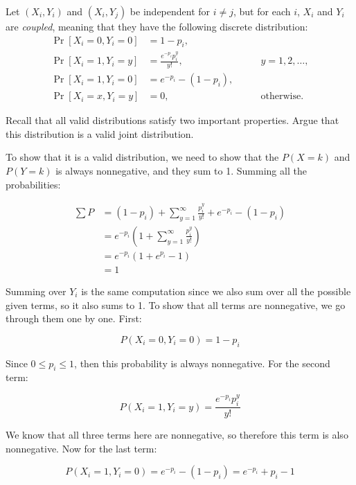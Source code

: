 \documentclass[11pt]{article}
\begin{document}
\begin{Parts}
    \setcounter{enumi}{2}
    \Part Let $(X_i, Y_i)$ and $(X_i, Y_j)$ be independent for $i \ne j$, but for each $i$, $X_i$ and $Y_i$ are \textit{coupled}, meaning that they have the following discrete distribution:
    \begin{align*}
        \Pr[X_i=0, Y_i=0] &= 1-p_i, & \\
        \Pr[X_i=1, Y_i=y] &= \frac{e^{-p_i} p_i^y}{y!}, &\qquad y = 1, 2, \dotsc, \\
        \Pr[X_i=1, Y_i=0] &= e^{-p_i} - (1-p_i), & \\
        \Pr[X_i=x, Y_i=y] &= 0, & \qquad \text{otherwise}.
    \end{align*}

    Recall that all valid distributions satisfy two important properties.
    Argue that this distribution is a valid joint distribution.

    \begin{solution}
        To show that it is a valid distribution, we need to show that the $P(X = k)$ and $P(Y = k)$ is always nonnegative, and they sum to 1. Summing all the probabilities: 

        \begin{align*}
            \sum P &= (1 - p_i) + \sum_{y = 1}^\infty \frac{p_i^y}{y!} + e^{-p_i} - (1 - p_i)\\
            &= e^{-p_i}\left(1 + \sum_{y = 1}^\infty \frac{p_i^y}{y!}\right)\\
            &= e^{-p_i}(1 + e^{p_i} - 1)\\
            &= 1
        \end{align*}

        Summing over $Y_i$ is the same computation since we also sum over all the possible given terms, so it also sums to 1. To show that all terms are nonnegative, we go through them one by one. First: 

        \[ P(X_i = 0, Y_i = 0) = 1- p_i\] 

        Since $0 \le p_i \le 1$, then this probability is always nonnegative. For the second term: 

        \[ P(X_i = 1, Y_i = y) = \frac{e^{-p_i}p_i^y}{y!}\] 

        We know that all three terms here are nonnegative, so therefore this term is also nonnegative. Now for the last term: 

        \[ P(X_i = 1, Y_i = 0) = e^{-p_i} - (1 - p_i) = e^{-p_i} + p_i - 1\] 


\end{solution}
\end{Parts}
\end{document}
